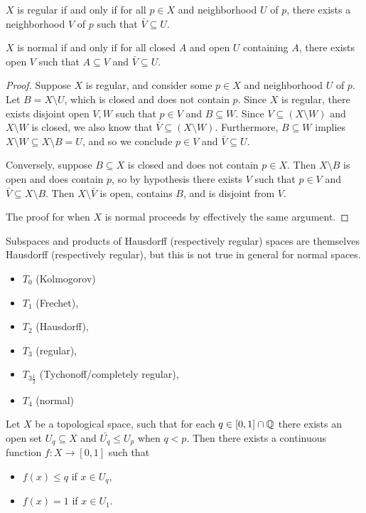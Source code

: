 \begin{thm}\label{thm:topo-regular-normal-characterization}
    $X$ is regular if and only if for all $p \in X$ and neighborhood $U$ of $p$, there exists a neighborhood $V$ of $p$ such that $\bar{V} \subseteq U$.

    $X$ is normal if and only if for all closed $A$ and open $U$ containing $A$, there exists open $V$ such that $A \subseteq V$ and $\bar{V} \subseteq U$.
\end{thm}

\begin{proof}
    Suppose $X$ is regular, and consider some $p \in X$ and neighborhood $U$ of $p$. Let $B = X \setminus U$, which is closed and does not contain $p$. Since $X$ is regular, there exists disjoint open $V, W$ such that $p \in V$ and $B \subseteq W$. Since $V \subseteq (X \setminus W)$ and $X \setminus W$ is closed, we also know that $\bar{V} \subseteq (X \setminus W)$. Furthermore, $B \subseteq W$ implies $X \setminus W \subseteq X \setminus B = U$, and so we conclude $p \in V$ and $\bar{V} \subseteq U$.

    Conversely, suppose $B \subseteq X$ is closed and does not contain $p \in X$. Then $X\setminus B$ is open and does contain $p$, so by hypothesis there exists $V$ such that $p \in V$ and $\bar{V} \subseteq X \setminus B$. Then $X \setminus \bar{V}$ is open, contains $B$, and is disjoint from $V$.

    The proof for when $X$ is normal proceeds by effectively the same argument.
\end{proof}

\begin{prop}
    Subspaces and products of Hausdorff (respectively regular) spaces are themselves Hausdorff (respectively regular), but this is not true in general for normal spaces.
\end{prop}

\begin{itemize}
    \item $T_0$ (Kolmogorov)
    \item $T_1$ (Frechet),
    \item $T_2$ (Hausdorff),
    \item $T_3$ (regular),
    \item $T_{3\frac{1}{2}}$ (Tychonoff/completely regular),
    \item $T_4$ (normal)
\end{itemize}

\begin{lemma}\label{lemma:urysohn-proto}
    Let $X$ be a topological space, such that for each $q \in [0, 1] \cap \mathbb{Q}$ there exists an open set $U_q \subseteq X$ and $\bar{U_q} \leq U_p$ when $q < p$. Then there exists a continuous function $f: X \to [0, 1]$ such that
    \begin{itemize}
        \item $f(x) \leq q$ if $x \in U_q$,
        \item $f(x) = 1$ if $x \in U_1$.
    \end{itemize}
\end{lemma}

